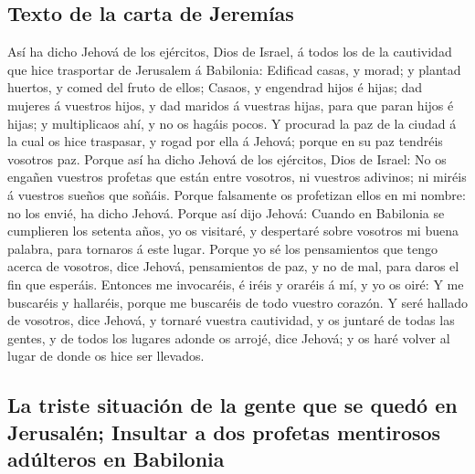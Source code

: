 \hypertarget{texto-de-la-carta-de-jeremuxedas}{%
\subsection{Texto de la carta de
Jeremías}\label{texto-de-la-carta-de-jeremuxedas}}

 Así ha dicho Jehová de los ejércitos, Dios de Israel, á
todos los de la cautividad que hice trasportar de Jerusalem á Babilonia:
 Edificad casas, y morad; y plantad huertos, y comed del
fruto de ellos;  Casaos, y engendrad hijos é hijas; dad
mujeres á vuestros hijos, y dad maridos á vuestras hijas, para que paran
hijos é hijas; y multiplicaos ahí, y no os hagáis pocos. 
Y procurad la paz de la ciudad á la cual os hice traspasar, y rogad por
ella á Jehová; porque en su paz tendréis vosotros paz. 
Porque así ha dicho Jehová de los ejércitos, Dios de Israel: No os
engañen vuestros profetas que están entre vosotros, ni vuestros
adivinos; ni miréis á vuestros sueños que soñáis.  Porque
falsamente os profetizan ellos en mi nombre: no los envié, ha dicho
Jehová.  Porque así dijo Jehová: Cuando en Babilonia se
cumplieren los setenta años, yo os visitaré, y despertaré sobre vosotros
mi buena palabra, para tornaros á este lugar.  Porque yo
sé los pensamientos que tengo acerca de vosotros, dice Jehová,
pensamientos de paz, y no de mal, para daros el fin que esperáis.
 Entonces me invocaréis, é iréis y oraréis á mí, y yo os
oiré:  Y me buscaréis y hallaréis, porque me buscaréis de
todo vuestro corazón.  Y seré hallado de vosotros, dice
Jehová, y tornaré vuestra cautividad, y os juntaré de todas las gentes,
y de todos los lugares adonde os arrojé, dice Jehová; y os haré volver
al lugar de donde os hice ser llevados.

\hypertarget{la-triste-situaciuxf3n-de-la-gente-que-se-queduxf3-en-jerusaluxe9n-insultar-a-dos-profetas-mentirosos-aduxfalteros-en-babilonia}{%
\subsection{La triste situación de la gente que se quedó en Jerusalén;
Insultar a dos profetas mentirosos adúlteros en
Babilonia}\label{la-triste-situaciuxf3n-de-la-gente-que-se-queduxf3-en-jerusaluxe9n-insultar-a-dos-profetas-mentirosos-aduxfalteros-en-babilonia}}

